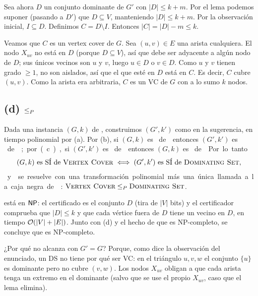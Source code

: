 Sea ahora $D$ un conjunto dominante de $G'$ con $|D|\le k+m$. Por el lema podemos suponer (pasando a $D'$)
que $D\subseteq V$, manteniendo $|D|\le k+m$. Por la observación inicial, $I\subseteq D$. Definimos
$C=D\setminus I$. Entonces $|C| = |D|-m\le k$.

Veamos que $C$ es un vertex cover de $G$. Sea $(u,v)\in E$ una arista cualquiera. El nodo $X_{uv}$ no está en
$D$ (porque $D\subseteq V$), así que debe ser adyacente a algún nodo de $D$; sus únicos vecinos son $u$ y $v$,
luego $u\in D$ o $v\in D$. Como $u$ y $v$ tienen grado $\ge1$, no son aislados, así que el que esté en $D$ está
en $C$. Es decir, $C$ cubre $(u,v)$. Como la arista era arbitraria, $C$ es un VC de $G$ con a lo sumo $k$ nodos.

\subsection*{(d) \VC{} $\le_P$ \DS}

Dada una instancia $(G,k)$ de \VC, construimos $(G',k')$ como en la sugerencia, en tiempo polinomial por (a).
Por (b), si $(G,k)$ es \SI{} de \VC{} entonces $(G',k')$ es \SI{} de \DS; por (c), si $(G',k')$ es \SI{} de
\DS{} entonces $(G,k)$ es \SI{} de \VC. Por lo tanto
\[
  (G,k) \text{ es S\'I{} de \textsc{Vertex Cover}} \iff (G',k') \text{ es S\'I{} de \textsc{Dominating Set}},
\]
y \VC{} se resuelve con una transformación polinomial más una única llamada a la caja negra de \DS:
$\textsc{Vertex Cover}\le_P\textsc{Dominating Set}$.

\begin{observacion}
\DS{} está en $\mathsf{NP}$: el certificado es el conjunto $D$ (tira de $|V|$ bits) y el certificador comprueba que
$|D|\le k$ y que cada vértice fuera de $D$ tiene un vecino en $D$, en tiempo $\mathcal{O}(|V|+|E|)$. Junto con (d) y
el hecho de que \VC{} es NP-completo, se concluye que \DS{} es NP-completo.

¿Por qué no alcanza con $G'=G$? Porque, como dice la observación del enunciado, un DS no tiene por qué ser
VC: en el triángulo $u,v,w$ el conjunto $\{u\}$ es dominante pero no cubre $(v,w)$. Los nodos $X_{uv}$ obligan
a que cada arista tenga un extremo en el dominante (salvo que se use el propio $X_{uv}$, caso que el lema
elimina).
\end{observacion}


